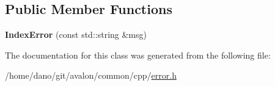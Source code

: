 \subsection*{Public Member Functions}
\begin{DoxyCompactItemize}
\item 
\mbox{\label{classtcf_1_1error_1_1IndexError_accc6b92ca66e72c151d6fe2ee1050a48}} 
{\bfseries Index\+Error} (const std\+::string \&msg)
\end{DoxyCompactItemize}


The documentation for this class was generated from the following file\+:\begin{DoxyCompactItemize}
\item 
/home/dano/git/avalon/common/cpp/\hyperlink{error_8h}{error.\+h}\end{DoxyCompactItemize}
